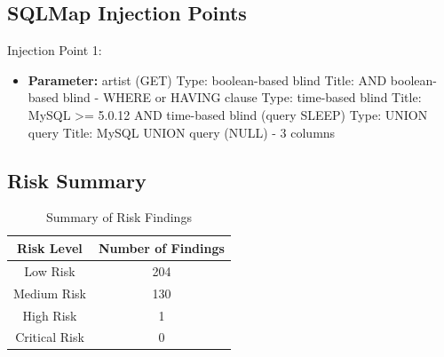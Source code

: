 \documentclass[12pt]{article}
\begin{document}
\subsection*{SQLMap Injection Points}
Injection Point 1:
\begin{itemize}
    \item \textbf{Parameter:} artist (GET)
        \subitem Type: boolean-based blind
        \subitem Title: AND boolean-based blind - WHERE or HAVING clause
        \subitem 
        \subitem Type: time-based blind
        \subitem Title: MySQL >= 5.0.12 AND time-based blind (query SLEEP)
        \subitem 
        \subitem Type: UNION query
        \subitem Title: MySQL UNION query (NULL) - 3 columns
\end{itemize}

\subsection{Risk Summary}
\begin{table}[h!]
\centering
\renewcommand{\arraystretch}{1.5}
\begin{tabular}{|c|c|}
\hline
\textbf{Risk Level} & \textbf{Number of Findings} \\
\hline
Low Risk & 204 \\ 
\hline
Medium Risk & 130 \\ 
\hline
High Risk & 1 \\ 
\hline
Critical Risk & 0 \\ 
\hline
\end{tabular}
\caption{Summary of Risk Findings}
\label{tab:risk_summary}
\end{table}
\end{document}
